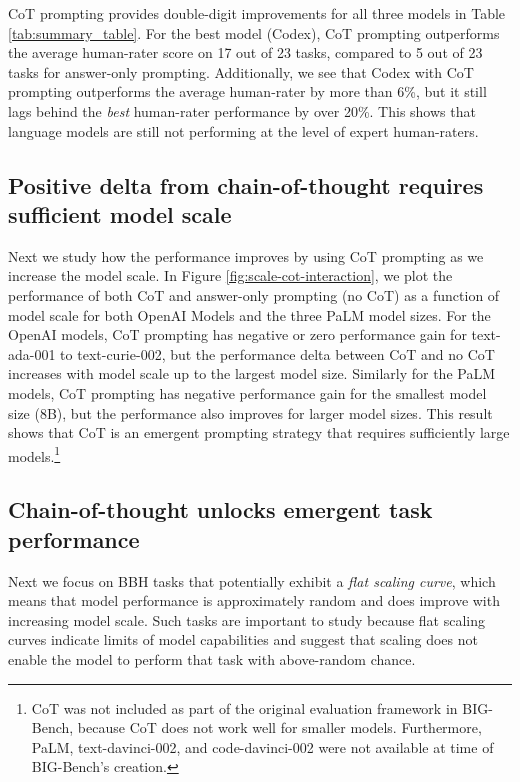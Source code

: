 CoT prompting provides double-digit improvements for all three models in Table \ref{tab:summary_table}.
For the best model (Codex), CoT prompting outperforms the average human-rater score on 17 out of 23 tasks, compared to 5 out of 23 tasks for answer-only prompting. Additionally, we see that Codex with CoT prompting outperforms the average human-rater by more than 6\%, but it still lags behind the \textit{best} human-rater performance by over 20\%.
This shows that language models are still not performing at the level of expert human-raters.

\subsection{Positive delta from chain-of-thought requires sufficient model scale}

Next we study how the performance improves by using CoT prompting as we increase the model scale. In Figure \ref{fig:scale-cot-interaction}, we plot the performance of both CoT and answer-only prompting (no CoT) as a function of model scale for both OpenAI Models and the three PaLM model sizes. For the OpenAI models, CoT prompting has negative or zero performance gain for text-ada-001 to text-curie-002, but the performance delta between CoT and no CoT increases with model scale up to the largest model size. Similarly for the PaLM models, CoT prompting has negative performance gain for the smallest model size (8B), but the performance also improves for larger model sizes. This result shows that CoT is an emergent prompting strategy \citep{wei2022emergent} that requires sufficiently large models.\footnote{
CoT was not included as part of the original evaluation framework in BIG-Bench, because CoT does not work well for smaller models. Furthermore, PaLM, text-davinci-002, and code-davinci-002 were not available at time of BIG-Bench's creation.}

\subsection{Chain-of-thought unlocks emergent task performance} Next we focus on BBH tasks that potentially exhibit a \textit{flat scaling curve}, which means that model performance is approximately random and does improve with increasing model scale. Such tasks are important to study because flat scaling curves indicate limits of model capabilities and suggest that scaling does not enable the model to perform that task with above-random chance.

